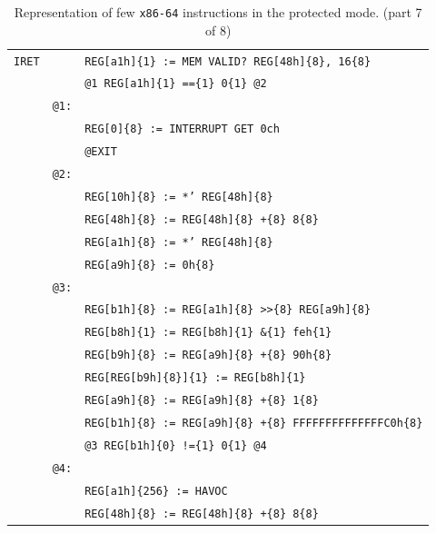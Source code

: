\documentclass[10pt,twocolumn]{article}
\begin{document}
\begin{table}[!h]
\begin{center}
\begin{tabular}{r|rl}
\texttt{IRET} & %
& \texttt{REG[a1h]\{1\} := MEM VALID? REG[48h]\{8\}, 16\{8\}} \\ & %
& \texttt{@1 REG[a1h]\{1\} ==\{1\} 0\{1\} @2} \\ & %
\texttt{@1:} \\ & %
& \texttt{REG[0]\{8\} := INTERRUPT GET 0ch} \\ & %
& \texttt{@EXIT} \\ & %
\texttt{@2:} \\ & %
& \texttt{REG[10h]\{8\} := *' REG[48h]\{8\}} \\ & %
& \texttt{REG[48h]\{8\} := REG[48h]\{8\} +\{8\} 8\{8\}} \\ & %
& \texttt{REG[a1h]\{8\} := *' REG[48h]\{8\}} \\ & %
& \texttt{REG[a9h]\{8\} := 0h\{8\}} \\ & %
\texttt{@3:} \\ & %
& \texttt{REG[b1h]\{8\} := REG[a1h]\{8\} >>\{8\} REG[a9h]\{8\}} \\ & %
& \texttt{REG[b8h]\{1\} := REG[b8h]\{1\} \&\{1\} feh\{1\}} \\ & %
& \texttt{REG[b9h]\{8\} := REG[a9h]\{8\} +\{8\} 90h\{8\}} \\ & %
& \texttt{REG[REG[b9h]\{8\}]\{1\} := REG[b8h]\{1\}} \\ & %
& \texttt{REG[a9h]\{8\} := REG[a9h]\{8\} +\{8\} 1\{8\}} \\ & %
& \texttt{REG[b1h]\{8\} := REG[a9h]\{8\} +\{8\} FFFFFFFFFFFFFFC0h\{8\}} \\ & %
& \texttt{@3 REG[b1h]\{0\} !=\{1\} 0\{1\} @4} \\ & %
\texttt{@4:} \\ & %
& \texttt{REG[a1h]\{256\} := HAVOC} \\ & %
& \texttt{REG[48h]\{8\} := REG[48h]\{8\} +\{8\} 8\{8\}} \\ \hline

\end{tabular}
\end{center}
\caption{Representation of few \texttt{x86-64} instructions in the
protected mode. (part 7 of 8)}
\end{table}

\clearpage
\end{document}
